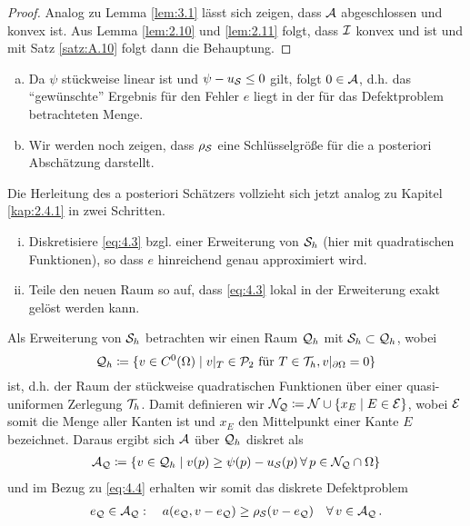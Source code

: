 \begin{proof}
Analog zu Lemma \ref{lem:3.1} lässt sich zeigen, dass $\mathcal A$ abgeschlossen und konvex ist. Aus Lemma \ref{lem:2.10} und \ref{lem:2.11} folgt, dass $\mathcal I$ konvex und  ist und mit Satz \ref{satz:A.10} folgt dann die Behauptung.
\end{proof}


\begin{bem*}
\begin{enumerate}[(a)]
\item Da $\psi$ stückweise linear ist und $\psi-u_{\mathcal S} \le 0$ gilt, folgt $0 \in \mathcal A$, d.h. das "`gewünschte"' Ergebnis für den Fehler $e$ liegt in der für das Defektproblem betrachteten Menge.
\item Wir werden noch zeigen, dass $\rho_{\mathcal S}$ eine Schlüsselgröße für die a posteriori Abschätzung darstellt.
\end{enumerate}
\end{bem*}


Die Herleitung des a posteriori Schätzers vollzieht sich jetzt analog zu Kapitel \ref{kap:2.4.1} in zwei Schritten.
\begin{enumerate}[(i)]
\item	Diskretisiere \eqref{eq:4.3} bzgl. einer Erweiterung von $\mathcal S_h$ (hier mit quadratischen Funktionen), so dass $e$ hinreichend genau approximiert wird.
\item Teile den neuen Raum so auf, dass \eqref{eq:4.3} lokal in der Erweiterung exakt gelöst werden kann.
\end{enumerate}


Als Erweiterung von $\mathcal S_h$ betrachten wir einen Raum $\mathcal Q_h$ mit $\mathcal S_h \subset \mathcal Q_h$, wobei
\[
	\mathcal Q_h \coloneqq \{v \in C^0(\Omega) \mid v|_T \in \mathcal P_2 \text{ für } T\in \mathcal T_h, v|_{\partial\Omega} = 0\}
\]
ist, d.h. der Raum der stückweise quadratischen Funktionen über einer quasi-uniformen Zerlegung $\mathcal T_h$. Damit definieren wir $\mathcal N_{\mathcal Q} \coloneqq \mathcal N \cup \{x_E \mid E \in \mathcal E\}$, wobei $\mathcal E$ somit die Menge aller Kanten ist und $x_E$ den Mittelpunkt einer Kante $E$ bezeichnet.  Daraus ergibt sich $\mathcal A$ über $\mathcal Q_h$ diskret als
\begin{align}\label{eq:4.4}
	\mathcal A_{\mathcal Q} \coloneqq \{v \in \mathcal Q_h \mid v(p) \ge \psi(p)-u_{\mathcal S}(p) \, \forall \, p \in \mathcal N_{\mathcal Q} \cap \Omega\} 
\end{align}
und im Bezug zu \eqref{eq:4.4} erhalten wir somit das diskrete Defektproblem
\begin{align}\label{eq:4.5}
	e_{\mathcal Q} \in \mathcal A_{\mathcal Q} : \quad a(e_{\mathcal Q}, v-e_{\mathcal Q}) \ge \rho_{\mathcal S}(v-e_{\mathcal Q}) \quad \forall \, v \in \mathcal A_{\mathcal Q} \, .
\end{align}


